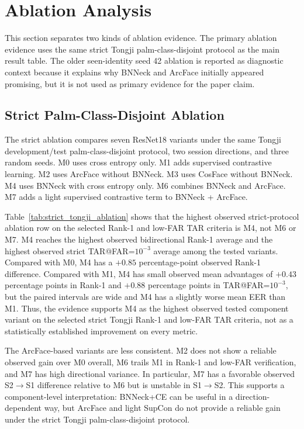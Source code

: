 \section{Ablation Analysis}
\label{sec:ablation}

This section separates two kinds of ablation evidence. The primary ablation evidence uses the same strict Tongji palm-class-disjoint protocol as the main result table. The older seen-identity seed 42 ablation is reported as diagnostic context because it explains why BNNeck and ArcFace initially appeared promising, but it is not used as primary evidence for the paper claim.

\subsection{Strict Palm-Class-Disjoint Ablation}

The strict ablation compares seven ResNet18 variants under the same Tongji development/test palm-class-disjoint protocol, two session directions, and three random seeds. M0 uses cross entropy only. M1 adds supervised contrastive learning. M2 uses ArcFace without BNNeck. M3 uses CosFace without BNNeck. M4 uses BNNeck with cross entropy only. M6 combines BNNeck and ArcFace. M7 adds a light supervised contrastive term to BNNeck + ArcFace.

Table~\ref{tab:strict_tongji_ablation} shows that the highest observed strict-protocol ablation row on the selected Rank-1 and low-FAR TAR criteria is M4, not M6 or M7. M4 reaches the highest observed bidirectional Rank-1 average and the highest observed strict TAR@FAR=$10^{-3}$ average among the tested variants. Compared with M0, M4 has a $+0.85$ percentage-point observed Rank-1 difference. Compared with M1, M4 has small observed mean advantages of $+0.43$ percentage points in Rank-1 and $+0.88$ percentage points in TAR@FAR=$10^{-3}$, but the paired intervals are wide and M4 has a slightly worse mean EER than M1. Thus, the evidence supports M4 as the highest observed tested component variant on the selected strict Tongji Rank-1 and low-FAR TAR criteria, not as a statistically established improvement on every metric.

The ArcFace-based variants are less consistent. M2 does not show a reliable observed gain over M0 overall, M6 trails M1 in Rank-1 and low-FAR verification, and M7 has high directional variance. In particular, M7 has a favorable observed S2$\rightarrow$S1 difference relative to M6 but is unstable in S1$\rightarrow$S2. This supports a component-level interpretation: BNNeck+CE can be useful in a direction-dependent way, but ArcFace and light SupCon do not provide a reliable gain under the strict Tongji palm-class-disjoint protocol.

